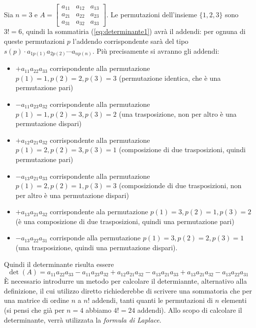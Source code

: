 \documentclass{book}
\theoremstyle{definition}
\theoremstyle{plain}
\begin{document}
Sia $n=3$ e $A=
\begin{bmatrix}
  a_{11} & a_{12} & a_{13}\\
  a_{21} & a_{22} & a_{23}\\
  a_{31} & a_{32} & a_{33}
\end{bmatrix}
$. Le permutazioni dell'insieme $\{1,2,3\}$ sono $3!=6$, quindi la sommatiria
(\ref{eq:determinante1}) avrà il addendi: per ognuna di queste permutazioni $p$
l'addendo corrispondente sarà del tipo $s(p)\cdot a_{1p(1)}a_{2p(2)}\cdots a_{np(n)}$.
Più precisamente si avranno gli addendi:
\begin{itemize}
\item $+a_{11}a_{22}a_{33}$ corrispondente alla permutazione $p(1)=1,p(2)=2, p(3)=3$
  (permutazione identica, che è una permutazione pari)
\item $-a_{11}a_{23}a_{32}$ corrispondente alla permutazione $p(1)=1,p(2)=3, p(3)=2$
  (una trasposizione, non per altro è una permutazione dispari)
\item $+a_{12}a_{21}a_{32}$ corrispondente alla permutazione $p(1)=2,p(2)=3, p(3)=1$
  (composizione di due trasposizioni, quindi permutazione pari)
\item $-a_{13}a_{21}a_{33}$ corrispondente alla permutazione $p(1)=2,p(2)=1, p(3)=3$
  (composizionde di due trasposizioni, non per altro è una permutazione dispari)
\item $+a_{13}a_{21}a_{32}$ corrispondente ala permutazione
  $p(1)=3,p(2)=1,p(3)=2$ (è una composizione di due trasposizioni, quindi
  una permutazione pari)
\item $-a_{13}a_{22}a_{31}$ corrisponde alla permutazione $p(1)=3, p(2)=2, p(3)=1$ (una trasposizione, quindi una permutazione dispari).
\end{itemize}
Quindi il determinante risulta essere
\begin{equation*}
  \det(A)=a_{11}a_{22}a_{33}-a_{11}a_{23}a_{32}+a_{12}a_{21}a_{32}-a_{13}a_{21}a_{33}+a_{13}a_{21}a_{32}-a_{13}a_{22}a_{31}
\end{equation*}
È necessario introdurre un metodo per calcolare il determiannte,
alternativo alla definizione, il cui utilizzo diretto richiederebbe di
scrivere una sommatoria che per una matrice di ordine $n$ a $n!$ addendi,
tanti quanti le permutazioni di $n$ elementi (si pensi che già per $n=4$
abbiamo $4!=24$ addendi). Allo scopo di calcolare il determinante,
verrà utilizzata la \textit{formula di Laplace}.
\end{document}
